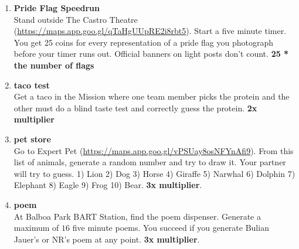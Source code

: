 \documentclass{article}
\begin{document}
\begin{enumerate}
    \item \textbf{Pride Flag Speedrun} \\ Stand outside The Castro Theatre (\url{https://maps.app.goo.gl/qTaHgUUpRE2i8rbt5}). Start a five minute timer. You get 25 coins for every representation of a pride flag you photograph before your timer runs out. Official banners on light posts don't count. \textbf{25 * the number of flags}
    \item \textbf{taco test} \\ Get a taco in the Mission where one team member picks the protein and the other must do a blind taste test and correctly guess the protein. \textbf{2x multiplier}
    \item  \textbf{pet store} \\ Go to Expert Pet (\url{https://maps.app.goo.gl/vPSUay8osNFYnAfi9}). From this list of animals, generate a random number and try to draw it. Your partner will try to guess. 1) Lion 2) Dog 3) Horse 4) Giraffe 5) Narwhal 6) Dolphin 7) Elephant 8) Eagle 9) Frog 10) Bear. \textbf{3x multiplier}.
    \item \textbf{poem} \\ At Balboa Park BART Station, find the poem dispenser. Generate a maximum of $16$ five minute poems. You succeed if you generate Bulian Jauer's or NR's poem at any point. \textbf{3x multiplier}.
\end{enumerate}
\end{document}
